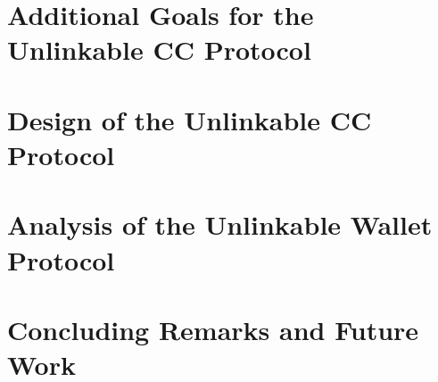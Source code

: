 \documentclass[12pt]{report}
\begin{document}
\chapter{Additional Goals for the Unlinkable CC Protocol}
\label{cha:unlinkable_goals}






\chapter{Design of the Unlinkable CC Protocol}
\label{cha:unlinkable_design}






\chapter{Analysis of the Unlinkable Wallet Protocol}
\label{cha:simulation}



%

\chapter{Concluding Remarks and Future Work}
\label{cha:conclusion}





\printindex

\begin{vita}

\end{vita}
\end{document}
